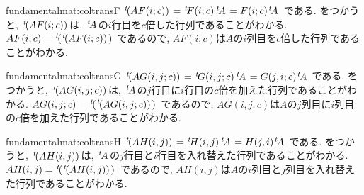 \begin{proofof*}{fundamentalmat:coltrans}{F}
  ${\left.^{t}\!(AF(i;c))\right.}={\left.^{t}\!F(i;c)\right.}{\left.^{t}\!A\right.}=F(i;c){\left.^{t}\!A\right.}$
  である.
  をつかうと,
  ${\left.^{t}\!(AF(i;c))\right.}$は,
  ${\left.^{t}\!A\right.}$の$i$行目を$c$倍した行列であることがわかる.
  $AF(i;c)={\left.^{t}\!({\left.^{t}\!(AF(i;c))\right.})\right.}$
  であるので,
  $AF(i;c)$は$A$の$i$列目を$c$倍した行列であることがわかる.
\end{proofof*}

\begin{proofof*}{fundamentalmat:coltrans}{G}
  ${\left.^{t}\!(AG(i,j;c))\right.}={\left.^{t}\!G(i,j;c)\right.}{\left.^{t}\!A\right.}=G(j,i;c){\left.^{t}\!A\right.}$
  である.
  をつかうと,
  ${\left.^{t}\!(AG(i,j;c))\right.}$は,
  ${\left.^{t}\!A\right.}$の$j$行目に$i$行目の$c$倍を加えた行列であることがわかる.
  $AG(i,j;c)={\left.^{t}\!({\left.^{t}\!(AG(i,j;c))\right.})\right.}$
  であるので,
  $AG(i,j;c)$は$A$の$j$列目に$i$列目の$c$倍を加えた行列であることがわかる.
\end{proofof*}

\begin{proofof*}{fundamentalmat:coltrans}{H}
  ${\left.^{t}\!(AH(i,j))\right.}={\left.^{t}\!H(i,j)\right.}{\left.^{t}\!A\right.}=H(j,i){\left.^{t}\!A\right.}$
  である.
  をつかうと,
  ${\left.^{t}\!(AH(i,j))\right.}$は,
  ${\left.^{t}\!A\right.}$の$j$行目と$i$行目を入れ替えた行列であることがわかる.
  $AH(i,j)={\left.^{t}\!({\left.^{t}\!(AH(i,j))\right.})\right.}$
  であるので,
  $AH(i,j)$は$A$の$i$列目と$j$列目を入れ替えた行列であることがわかる.
\end{proofof*}

